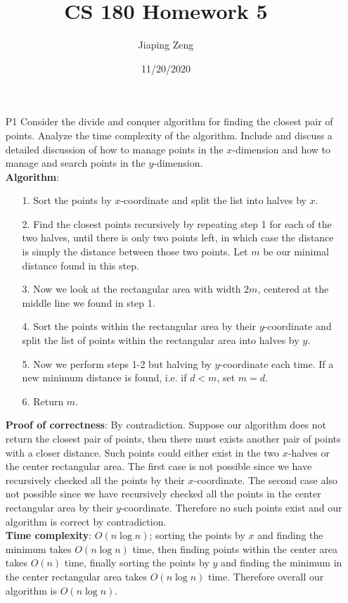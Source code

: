 \documentclass{article}
\title{CS 180 Homework 5}
\date{11/20/2020}
\author{Jiaping Zeng}
\begin{document}
\maketitle

\begin{itemize}
    \item [P1] Consider the divide and conquer algorithm for finding the closest pair of points. Analyze the time complexity of the algorithm. Include and discuss a detailed discussion of how to manage points in the $x$-dimension and how to manage and search points in the $y$-dimension.\\
          \textbf{Algorithm}:
          \begin{itemize}
              \item [1.] Sort the points by $x$-coordinate and split the list into halves by $x$.
              \item [2.] Find the closest points recursively by repeating step 1 for each of the two halves, until there is only two points left, in which case the distance is simply the distance between those two points. Let $m$ be our minimal distance found in this step.
              \item [3.] Now we look at the rectangular area with width $2m$, centered at the middle line we found in step 1.
              \item [4.] Sort the points within the rectangular area by their $y$-coordinate and split the list of points within the rectangular area into halves by $y$.
              \item [5.] Now we perform steps 1-2 but halving by $y$-coordinate each time. If a new minimum distance is found, i.e. if $d<m$, set $m=d$.
              \item [6.] Return $m$.
          \end{itemize}
          \textbf{Proof of correctness}: By contradiction. Suppose our algorithm does not return the closest pair of points, then there must exists another pair of points with a closer distance. Such points could either exist in the two $x$-halves or the center rectangular area. The first case is not possible since we have recursively checked all the points by their $x$-coordinate. The second case also not possible since we have recursively checked all the points in the center rectangular area by their $y$-coordinate. Therefore no such points exist and our algorithm is correct by contradiction.\\
          \textbf{Time complexity}: $O(n\log n)$; sorting the points by $x$ and finding the minimum takes $O(n\log n)$ time, then finding points within the center area takes $O(n)$ time, finally sorting the points by $y$ and finding the minimum in the center rectangular area takes $O(n\log n)$ time. Therefore overall our algorithm is $O(n\log n)$.

\end{itemize}
\end{document}
